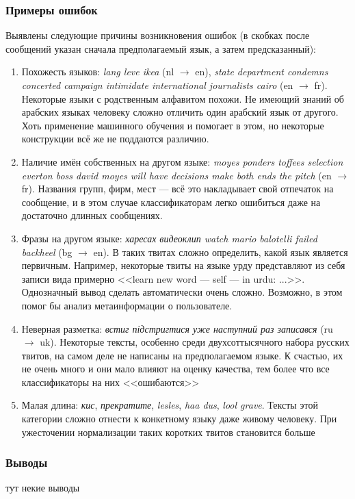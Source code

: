 \documentclass[a4paper, 14pt]{article}
\begin{document}
		\subsubsection{Примеры ошибок}
		Выявлены следующие причины возникновения ошибок (в скобках после сообщений указан сначала предполагаемый язык, а затем предсказанный):
		\begin{enumerate}
			\item Похожесть языков: \textit{lang leve ikea} (nl $\to$ en), 
				\textit{state department condemns concerted campaign intimidate international journalists cairo} (en $\to$ fr).
				Некоторые языки с родственным алфавитом похожи. Не имеющий знаний об арабских языках
				 человеку сложно отличить один арабский язык от другого. Хоть применение
				машинного обучения и помогает в этом, но некоторые конструкции всё же не поддаются различию.
			\item Наличие имён собственных на другом языке:
				\textit{moyes ponders toffees selection everton boss david moyes will have decisions make both ends the pitch} (en $\to$ fr).
				Названия групп, фирм, мест --- всё это накладывает свой отпечаток на сообщение, и в этом случае классификаторам
				легко ошибиться даже на достаточно длинных сообщениях.
			\item Фразы на другом языке:
				\textit{харесах видеоклип watch mario balotelli failed backheel} (bg $\to$ en). В таких твитах сложно определить, какой
				язык является первичным. Например, некоторые твиты на языке урду представляют из себя записи вида примерно 
				<<learn new word --- self --- in urdu: ...>>. Однозначный вывод сделать автоматически очень сложно. Возможно, в этом
				помог бы анализ метаинформации о пользователе.
			\item Неверная разметка: 
				\textit{встиг підстригтися уже наступний раз записався} (ru $\to$ uk). Некоторые тексты, особенно среди двухсоттысячного набора 
				русских твитов, на самом деле не написаны на предполагаемом языке. К счастью, их не очень много и они мало влияют на оценку
				качества, тем более что все классификаторы на них <<ошибаются>>
			\item Малая длина:
				\textit{кис}, \textit{прекратите}, \textit{lesles}, \textit{haa dus}, \textit{lool grave}. Тексты этой категории сложно отнести
				к конкетному языку даже живому человеку. При ужесточении нормализации таких коротких твитов становится больше
		\end{enumerate}
	
		\subsubsection{Выводы}
		тут некие выводы 
		
\end{document}
